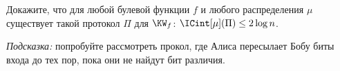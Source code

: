 Докажите, что для любой булевой функции $f$ и любого распределения $\mu$ существует такой протокол $\Pi$ для
$\KW_f$: $\ICint[\mu](\Pi) \le 2 \log n$. 
    
\textit{Подсказка:} попробуйте рассмотреть прокол, где Алиса пересылает Бобу биты входа до тех пор, пока они не
найдут бит различия.